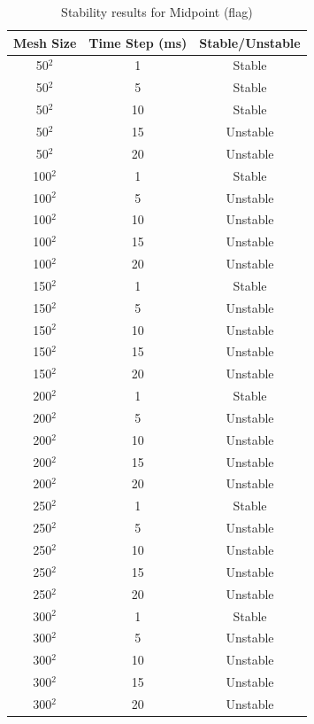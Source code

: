 \begin{table}[tp]
   \begin{minipage}{\textwidth}
      \begin{center}
         \begin{tabular}{|c|c|c|} \hline
           Mesh Size & Time Step (ms) & Stable/Unstable\\
           \hline
           50$^{2}$ & 1 & Stable\\ \hline
           50$^{2}$ & 5 & Stable\\ \hline
           50$^{2}$ & 10 & Stable\\ \hline
           50$^{2}$ & 15 & Unstable\\ \hline
           50$^{2}$ & 20 & Unstable\\ \hline
           100$^{2}$ & 1 & Stable\\ \hline
           100$^{2}$ & 5 & Unstable\\ \hline
           100$^{2}$ & 10 & Unstable\\ \hline
           100$^{2}$ & 15 & Unstable\\ \hline
           100$^{2}$ & 20 & Unstable\\ \hline           
           150$^{2}$ & 1 & Stable\\ \hline
           150$^{2}$ & 5 & Unstable\\ \hline
           150$^{2}$ & 10 & Unstable\\ \hline
           150$^{2}$ & 15 & Unstable\\ \hline
           150$^{2}$ & 20 & Unstable\\ \hline           
           200$^{2}$ & 1 & Stable\\ \hline
           200$^{2}$ & 5 & Unstable\\ \hline
           200$^{2}$ & 10 & Unstable\\ \hline
           200$^{2}$ & 15 & Unstable\\ \hline
           200$^{2}$ & 20 & Unstable\\ \hline           
           250$^{2}$ & 1 & Stable\\ \hline
           250$^{2}$ & 5 & Unstable\\ \hline
           250$^{2}$ & 10 & Unstable\\ \hline
           250$^{2}$ & 15 & Unstable\\ \hline
           250$^{2}$ & 20 & Unstable\\ \hline           
           300$^{2}$ & 1 & Stable\\ \hline
           300$^{2}$ & 5 & Unstable\\ \hline
           300$^{2}$ & 10 & Unstable\\ \hline
           300$^{2}$ & 15 & Unstable\\ \hline
           300$^{2}$ & 20 & Unstable\\ \hline
         \end{tabular}
      \end{center}
   \end{minipage}
   \caption{Stability results for Midpoint (flag)}
   \label{tab:m stability flag}
\end{table}

